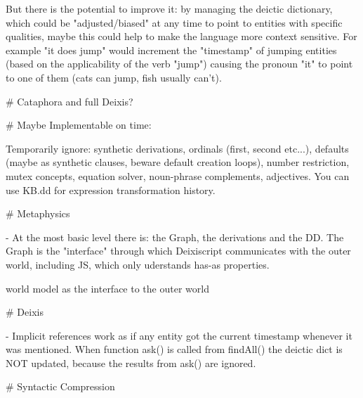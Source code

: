 But there is the potential to improve it: by managing the deictic dictionary, which could be "adjusted/biased" at any time to point to entities with specific qualities, maybe this could help to make the language more context sensitive. For example "it does jump" would increment the "timestamp" of jumping entities (based on the applicability of the verb "jump") causing the pronoun "it" to point to one of them (cats can jump, fish usually can't).

# Cataphora and full Deixis?


# Maybe Implementable on time:

Temporarily ignore: synthetic derivations, ordinals (first, second etc...), defaults (maybe as synthetic clauses, beware default creation loops), number restriction, mutex concepts, equation solver, noun-phrase complements, adjectives. You can use KB.dd for expression transformation history.


# Metaphysics

- At the most basic level there is: the Graph, the derivations and the DD. The Graph is the "interface" through which Deixiscript communicates with the outer world, including JS, which only uderstands has-as properties.

world model as the interface to the outer world

# Deixis

- Implicit references work as if any entity got the current timestamp whenever
  it was mentioned. When function ask() is called from findAll() the deictic
  dict is NOT updated, because the results from ask() are ignored.

# Syntactic Compression
